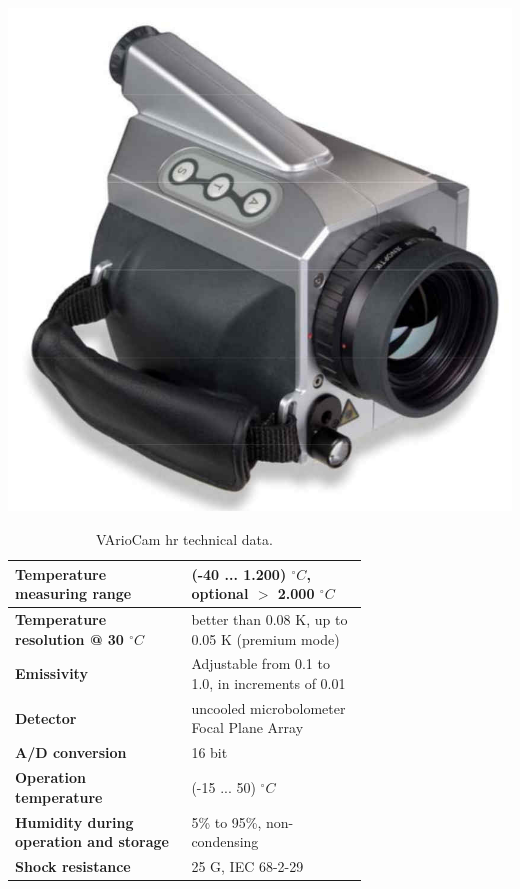 		\begin{table}[ht!]
    		\begin{minipage}[b]{0.4\linewidth}
  				\centering
  				\captionsetup{justification=centering, margin=0.5cm}
  				\includegraphics[scale=0.3]{Figures/Chapter02/PictureOfIRCamera.jpg}
  				\label{fig2.5}
    		\end{minipage}
    		\begin{minipage}[b]{0.7\linewidth}
    			\centering
  				\captionsetup{justification=raggedright}
        		\caption{VArioCam hr technical data.}\label{tab2.1}
				\begin{tabular}{p{0.35\linewidth}p{0.35\linewidth}}\hline
					\textbf{Temperature measuring range} & (-40 ... 1.200) $^{\circ}C$, optional $>$ 2.000 $^{\circ}C$ \\ \hline 
					\textbf{Temperature resolution @ 30 $^{\circ}C$} &  better than 0.08 K, up to 0.05 K (premium mode) \\ \hline
					\textbf{Emissivity} & Adjustable from 0.1 to 1.0, in increments of 0.01 \\ \hline
					\textbf{Detector} &  uncooled microbolometer Focal Plane Array \\ \hline
					\textbf{A/D conversion} &  16 bit \\ \hline 
					\textbf{Operation temperature} & (-15 ... 50) $^{\circ}C$ \\ \hline
					\textbf{Humidity during operation and storage} & 5\% to 95\%, non-condensing \\ \hline
					\textbf{Shock resistance} & 25 G, IEC 68-2-29 \\ \hline
				\end{tabular}
    		\end{minipage}
		\end{table}
		
